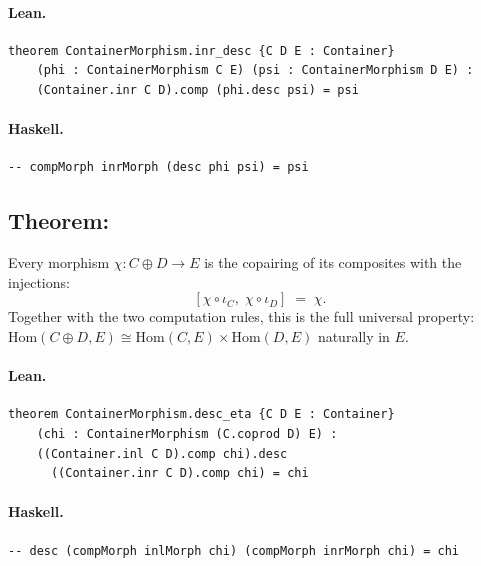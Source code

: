 \documentclass[11pt,a4paper]{article}
\begin{document}
\paragraph{Lean.}
\begin{lstlisting}[style=lean]
theorem ContainerMorphism.inr_desc {C D E : Container}
    (phi : ContainerMorphism C E) (psi : ContainerMorphism D E) :
    (Container.inr C D).comp (phi.desc psi) = psi
\end{lstlisting}

\paragraph{Haskell.}
\begin{lstlisting}[style=haskell]
-- compMorph inrMorph (desc phi psi) = psi
\end{lstlisting}


\subsection{Theorem: }

\begin{thm}
Every morphism $\chi : C \oplus D \to E$ is the copairing of its composites
with the injections:
\[
  [\chi \circ \iota_C,\; \chi \circ \iota_D] \;=\; \chi.
\]
Together with the two computation rules, this is the full universal property:
$\mathrm{Hom}(C \oplus D, E) \cong \mathrm{Hom}(C, E) \times \mathrm{Hom}(D, E)$
naturally in $E$.
\end{thm}

\paragraph{Lean.}
\begin{lstlisting}[style=lean]
theorem ContainerMorphism.desc_eta {C D E : Container}
    (chi : ContainerMorphism (C.coprod D) E) :
    ((Container.inl C D).comp chi).desc
      ((Container.inr C D).comp chi) = chi
\end{lstlisting}

\paragraph{Haskell.}
\begin{lstlisting}[style=haskell]
-- desc (compMorph inlMorph chi) (compMorph inrMorph chi) = chi
\end{lstlisting}
\end{document}
